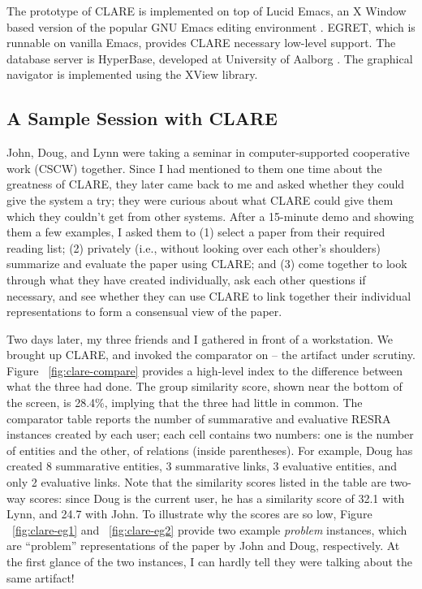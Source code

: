 The prototype of CLARE is implemented on top of Lucid Emacs, an X Window
based version of the popular GNU Emacs editing environment
\cite{Stallman85}. EGRET, which is runnable on vanilla Emacs, provides
CLARE necessary low-level support. The database server is HyperBase,
developed at University of Aalborg \cite{Wiil90}. The graphical navigator
is implemented using the XView library.


\subsection{A Sample Session with CLARE}
\label{sec:session}

John, Doug, and Lynn were taking a seminar in computer-supported
cooperative work (CSCW) together. Since I had mentioned to them one time
about the greatness of CLARE, they later came back to me and asked whether
they could give the system a try; they were curious about what CLARE could
give them which they couldn't get from other systems. After a 15-minute
demo and showing them a few examples, I asked them to (1) select a paper
from their required reading list; (2) privately (i.e., without looking over
each other's shoulders) summarize and evaluate the paper using CLARE; and
(3) come together to look through what they have created individually, ask
each other questions if necessary, and see whether they can use CLARE to
link together their individual representations to form a consensual view of
the paper.

Two days later, my three friends and I gathered in front of a workstation.
We brought up CLARE, and invoked the comparator on \cite{Kaplan92} -- the
artifact under scrutiny. Figure ~\ref{fig:clare-compare} provides a
high-level index to the difference between what the three had done. The
group similarity score, shown near the bottom of the screen, is 28.4\%,
implying that the three had little in common. The comparator table reports
the number of summarative and evaluative RESRA instances created by each
user; each cell contains two numbers: one is the number of entities and the
other, of relations (inside parentheses). For example, Doug has created 8
summarative entities, 3 summarative links, 3 evaluative entities, and only
2 evaluative links. Note that the similarity scores listed in the table are
two-way scores: since Doug is the current user, he has a similarity score
of 32.1 with Lynn, and 24.7 with John. To illustrate why the scores are so
low, Figure ~\ref{fig:clare-eg1} and ~\ref{fig:clare-eg2} provide two
example {\it problem\/} instances, which are ``problem'' representations of
the paper by John and Doug, respectively. At the first glance of the two
instances, I can hardly tell they were talking about the same artifact!


